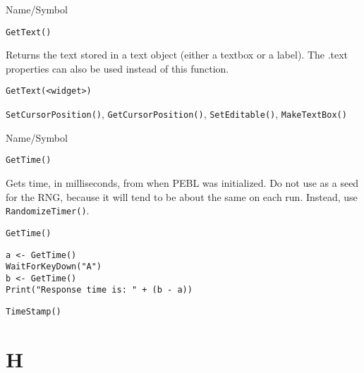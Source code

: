 \begin{desc}{Name/Symbol}
\item[Name/Symbol]	\verb+GetText()+

\item[Description]	Returns the text stored in a text object 
		(either a textbox or a label).  The .text properties can also
  be used instead of this function.

\item[Usage]
\begin{verbatim}
GetText(<widget>)
\end{verbatim}

\item[Example]	

\item[See Also]	\verb+SetCursorPosition()+, \verb+GetCursorPosition()+, \verb+SetEditable()+, \verb+MakeTextBox()+
\end{desc}

\rl



\begin{desc}{Name/Symbol}
\item[Name/Symbol]	\verb+GetTime()+

\item[Description] Gets time, in milliseconds, from when PEBL was
  initialized.  Do not use as a seed for the RNG, because it will tend
  to be about the same on each run. Instead, use \verb+RandomizeTimer()+.

\item[Usage]
\begin{verbatim}
GetTime()
\end{verbatim}

\item[Example]
\begin{verbatim}
a <- GetTime()
WaitForKeyDown("A")
b <- GetTime()
Print("Response time is: " + (b - a))
\end{verbatim}

\item[See Also]	\verb+TimeStamp()+
\end{desc}

\rl

\section{H}
\rl



